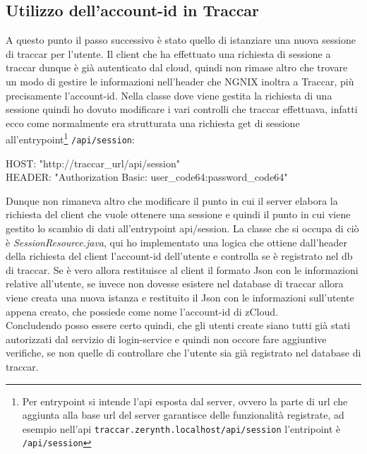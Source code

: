 \documentclass[a4paper,titlepage,12pt]{book}
\begin{document}
\subsection{\sffamily
Utilizzo dell'account-id in Traccar}
A questo punto il passo successivo è stato quello di istanziare una nuova sessione di traccar per l'utente. Il client che ha effettuato una richiesta di sessione a traccar dunque è già autenticato dal cloud, quindi non rimase altro che trovare un modo di gestire le informazioni nell'header che NGNIX  inoltra a Traccar, più precisamente l'account-id. Nella classe dove viene gestita la richiesta di una sessione quindi ho dovuto modificare i vari controlli che traccar effettuava, infatti ecco come normalmente era strutturata una richiesta get di sessione all'entrypoint\footnote{\sffamily Per entrypoint si intende l'api esposta dal server, ovvero la parte di url che aggiunta alla base url del server garantisce delle funzionalità registrate, ad esempio nell'api \texttt{traccar.zerynth.localhost/api/session} l'entripoint è \texttt{/api/session}} \texttt{/api/session}:\par\medskip

\begin{center}\begin{flushleft}
HOST: "http://traccar\_url/api/session"\\
HEADER: "Authorization Basic: user\_code64:password\_code64"\par\medskip
\end{flushleft}

\end{center}

Dunque non rimaneva altro che modificare il punto in cui il server elabora la richiesta del client che vuole ottenere una sessione e quindi il punto in cui viene gestito lo scambio di dati all'entrypoint api/session. La classe che si occupa di ciò è \textit{SessionResource.java}, qui ho implementato una logica che ottiene dall'header della richiesta del client l'account-id dell'utente e controlla se è registrato nel db di traccar. Se è vero allora restituisce al client il formato Json con le informazioni relative all'utente, se invece non dovesse esistere nel database di traccar allora viene creata una nuova istanza e restituito il Json con le informazioni sull'utente appena creato, che possiede come nome l'account-id di zCloud.\\
Concludendo posso essere certo quindi, che gli utenti create siano tutti già stati autorizzati dal servizio di login-service e quindi non occore fare aggiuntive verifiche, se non quelle di controllare che l'utente sia già registrato nel database di traccar.
\end{document}
